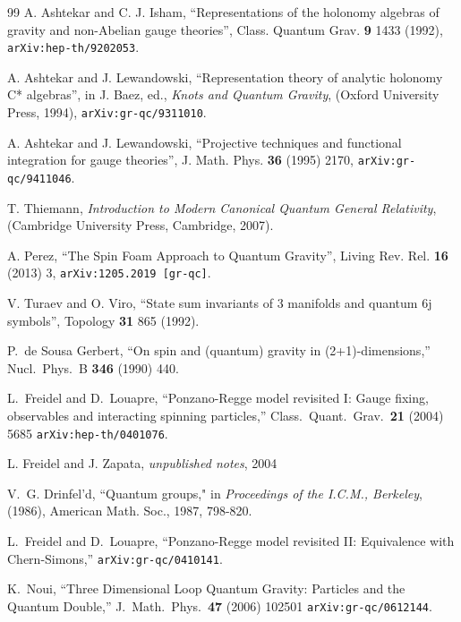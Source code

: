 \documentclass[nofootinbib,superscriptaddress,eqsecnum,tightenlines,11pt]{revtex4-1}
\begin{document}
\begin{thebibliography}{99}
A. Ashtekar and C. J. Isham,
``Representations of the holonomy algebras of gravity and non-Abelian gauge theories'',
Class. Quantum Grav. \textbf{9} 1433 (1992), \texttt{arXiv:hep-th/9202053}.

 A. Ashtekar and J. Lewandowski,
``Representation theory of analytic holonomy C* algebras'',
in J. Baez, ed., \textit{Knots and Quantum Gravity},
(Oxford University Press, 1994), \texttt{arXiv:gr-qc/9311010}.

A. Ashtekar and J. Lewandowski,
``Projective techniques and functional integration for gauge theories'',
J. Math. Phys. \textbf{36} (1995) 2170, \texttt{arXiv:gr-qc/9411046}.

T. Thiemann,
\textit{Introduction to Modern Canonical Quantum General Relativity},
(Cambridge University Press, Cambridge, 2007).


 A. Perez,
``The Spin Foam Approach to Quantum Gravity'',
Living Rev. Rel. \textbf{16} (2013) 3, \texttt{arXiv:1205.2019 [gr-qc]}.


 V. Turaev and O. Viro,
``State sum invariants of 3 manifolds and quantum 6j symbols'',
Topology \textbf{31} 865 (1992).

P.~de Sousa Gerbert,
  ``On spin and (quantum) gravity in (2+1)-dimensions,''
  Nucl.\ Phys.\ B {\bf 346} (1990) 440.

 L.~Freidel and D.~Louapre,
  ``Ponzano-Regge model revisited I: Gauge fixing, observables and interacting spinning particles,''
  Class.\ Quant.\ Grav.\  {\bf 21} (2004) 5685
  \texttt{arXiv:hep-th/0401076}.


  L. Freidel and J. Zapata, {\it unpublished notes}, 2004 

V.~G. Drinfel'd,
``Quantum groups," 
in {\it Proceedings of the I.C.M., Berkeley}, (1986), American Math. Soc., 1987, 798-820.

 L.~Freidel and D.~Louapre,
  ``Ponzano-Regge model revisited II: Equivalence with Chern-Simons,''
  \texttt{arXiv:gr-qc/0410141}.

 K.~Noui,
  ``Three Dimensional Loop Quantum Gravity: Particles and the Quantum Double,''
  J.\ Math.\ Phys.\  {\bf 47} (2006) 102501
 \texttt{arXiv:gr-qc/0612144}.


\end{thebibliography}
\end{document}
